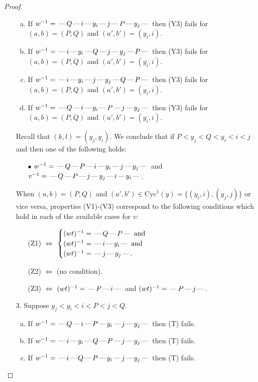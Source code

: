 \documentclass[10pt]{article}
\theoremstyle{definition}
\theoremstyle{definition}
\def\dash{\text{\hspace{0.5mm}---\hspace{0.5mm}}}
\def\Cyc{\mathrm{Cyc}}
\begin{document}
\begin{proof}
\begin{enumerate}
\begin{enumerate}[(a)]
\item If $w^{-1} = \dash Q\dash i\dash y_i\dash j\dash P\dash y_j\dash $ then (Y3) fails for $(a,b)=(P,Q)$ and $(a',b')=(y_i,i)$.
\item If $w^{-1} = \dash i\dash y_i\dash Q\dash j\dash y_j\dash P\dash $ then (Y3) fails for $(a,b)=(P,Q)$ and $(a',b')=(y_i,i)$.
\item If $w^{-1} = \dash i\dash y_i\dash j\dash y_j\dash Q\dash P\dash $ then (Y3) fails for $(a,b)=(P,Q)$ and $(a',b')=(y_i,i)$.
\item If $w^{-1} = \dash Q\dash i\dash y_i\dash P\dash j\dash y_j\dash $ then (Y3) fails for $(a,b)=(P,Q)$ and $(a',b')=(y_i,i)$.
\end{enumerate}
Recall that $(k,l) = (y_j,y_i)$.
We conclude that if $P < y_j < Q < y_i < i < j$ and then one of the following holds:
\begin{enumerate}
\item[$\bullet$] $w^{-1} = \dash Q\dash P\dash i\dash y_i\dash j\dash y_j\dash $ and $v^{-1} = \dash Q\dash P\dash j\dash y_j\dash i\dash y_i\dash $.
\end{enumerate}
When $(a,b)= (P,Q)$ and $(a',b')\in \Cyc^1(y)=\{(y_i,i),(y_j,j)\}$ or vice versa,
properties (V1)-(V3) correspond to the following conditions which hold in
each of the available cases for $v$:
\begin{enumerate}
\item[](Z1) $\Leftrightarrow$ $\begin{cases}\text{$(wt)^{-1} = \dash Q \dash P \dash$}\text{ and }\\
\text{$(wt)^{-1} = \dash i \dash y_i \dash$}\text{ and }\\
\text{$(wt)^{-1} = \dash j \dash y_j \dash$}.\end{cases}$
\item[](Z2) $\Leftrightarrow$ (no condition).
\item[](Z3) $\Leftrightarrow$ $(wt)^{-1} = \dash P \dash i \dash$  and $(wt)^{-1} = \dash P \dash j \dash$.
\end{enumerate}
\item[$3$.] Suppose $y_j < y_i < i < P < j < Q$.
\begin{enumerate}[(a)]
\item If $w^{-1} = \dash Q\dash i\dash P\dash y_i\dash j\dash y_j\dash $ then (T) fails.
\item If $w^{-1} = \dash i\dash y_i\dash Q\dash P\dash j\dash y_j\dash $ then (T) fails.
\item If $w^{-1} = \dash i\dash Q\dash P\dash y_i\dash j\dash y_j\dash $ then (T) fails.

\end{enumerate}
\end{enumerate}
\end{proof}
\end{document}
